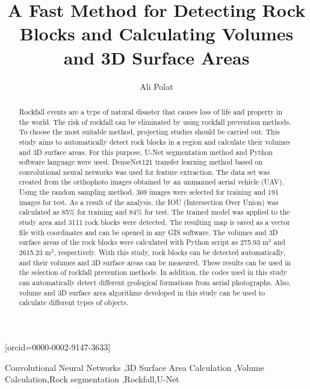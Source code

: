 \documentclass[a4paper,fleqn]{cas-sc}
\begin{document}
\let\WriteBookmarks\relax
\def\floatpagepagefraction{1}
\def\textpagefraction{.001}

\title [mode = title]{A Fast Method for Detecting Rock Blocks and Calculating Volumes and 3D Surface Areas}


\author[0]{Ali Polat}[orcid=0000-0002-9147-3633]




\address[0]{Provincial Directorate of Disaster and Emergency, 58000, Sivas, Turkey}


\begin{abstract}
Rockfall events are a type of natural disaster that causes loss of life and property in the world. The risk of rockfall can be eliminated by using rockfall prevention methods. To choose the most suitable method, projecting studies should be carried out. This study aims to automatically detect rock blocks in a region and calculate their volumes and 3D surface areas. For this purpose, U-Net segmentation method and Python software language were used. DenseNet121 transfer learning method based on convolutional neural networks was used for feature extraction. The data set was created from the orthophoto images obtained by an unmanned aerial vehicle (UAV). Using the random sampling method, 369 images were selected for training and 191 images for test. As a result of the analysis, the IOU (Intersection Over Union) was calculated as 85\% for training and 84\% for test. The trained model was applied to the study area and 3111 rock blocks were detected. The resulting map is saved as a vector file with coordinates and can be opened in any GIS software. The volumes and 3D surface areas of the rock blocks were calculated with Python script as 275.93 m$^3$ and 2615.23 m$^2$, respectively. With this study, rock blocks can be detected automatically, and their volumes and 3D surface areas can be measured. These results can be used in the selection of rockfall prevention methods. In addition, the codes used in this study can automatically detect different geological formations from aerial photographs. Also, volume and 3D surface area algorithms developed in this study can be used to calculate different types of objects.
\end{abstract}
 



\begin{keywords}
Convolutional Neural Networks \sep 3D Surface Area Calculation \sep Volume Calculation\sep  Rock segmentation \sep  Rockfall\sep U-Net
\end{keywords}
\end{document}
